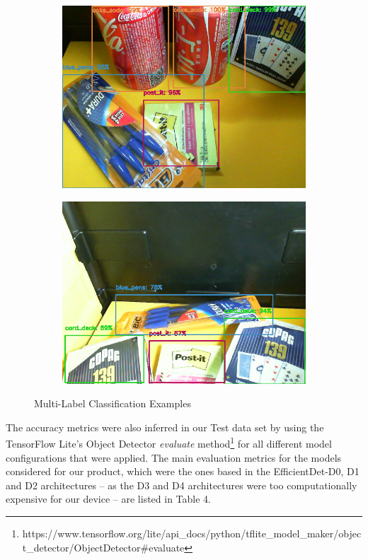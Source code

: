 \documentclass[openright]{normas-utf-tex} %
\begin{document}
\begin{figure}[H]
    \begin{subfigure}{0.5\textwidth}
        \centering
        \includegraphics[width=.95\textwidth]{./images/multilabel-classification-1.png}
        \caption{}
    \end{subfigure}
    \begin{subfigure}{0.5\textwidth}
        \centering
        \includegraphics[width=.95\textwidth]{./images/multilabel-classification-2.png}
        \caption{}
    \end{subfigure}
	\caption[Multi-Label Classification Examples]{Multi-Label Classification Examples}
    \label{fig:multiclassification}
\end{figure}

The accuracy metrics were also inferred in our Test data set by using the TensorFlow Lite's 
Object Detector \textit{evaluate} method\footnote{https://www.tensorflow.org/lite/api\_docs/python/tflite\_model\_maker/object\_detector/ObjectDetector\#evaluate}
for all different model configurations that were applied. 
The main evaluation metrics for the models considered for our product, which were the ones based 
in the EfficientDet-D0, D1 and D2 architectures -- as the D3 and D4 architectures were too 
computationally expensive for our device -- are listed in Table 4. 
\end{document}
